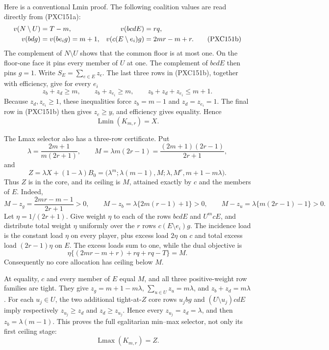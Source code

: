 \documentclass[11pt]{article}
\newcommand{\Lmin}{\operatorname{Lmin}}
\newcommand{\Lmax}{\operatorname{Lmax}}
\begin{document}
Here is a conventional Lmin proof.  The following coalition values are
read directly from (PXC151a):
\begin{align}
 v(N\setminus U)&=T-m,&
 v(bcdE)&=rq,\notag\\
 v(bdg)&=v(be_i g)=m+1,&
 v(c(E\setminus e_i)g)&=2mr-m+r.                  \tag{PXC151b}
\end{align}
The complement of \(N\setminus U\) shows that the common floor is at most
one.  On the floor-one face it pins every member of \(U\) at one.  The
complement of \(bcdE\) then pins \(g=1\).  Write
\(S_E=\sum_{e\in E}z_e\).  The last three rows in (PXC151b), together with
efficiency, give for every \(e_i\)
\[
 z_b+z_d\ge m,\qquad z_b+z_{e_i}\ge m,\qquad
 z_b+z_d+z_{e_i}\le m+1.                           \tag{PXC151c}
\]
Because \(z_d,z_{e_i}\ge1\), these inequalities force
\(z_b=m-1\) and \(z_d=z_{e_i}=1\).  The final row in (PXC151b) then gives
\(z_c\ge y\), and efficiency gives equality.  Hence
\[
 \Lmin(K_{m,r})=X.                                  \tag{PXC151d}
\]

The Lmax selector also has a three-row certificate.  Put
\[
 \lambda=\frac{2m+1}{m(2r+1)},\qquad
 M=\lambda m(2r-1)=\frac{(2m+1)(2r-1)}{2r+1},
\]
and
\begin{equation}
 Z=\lambda X+(1-\lambda)B_0
  =\bigl(\lambda^m;\lambda(m-1),M;\lambda,M^r,
          m+1-m\lambda\bigr).                       \tag{PXC151e}
\end{equation}
Thus \(Z\) is in the core, and its ceiling is \(M\), attained exactly by
\(c\) and the members of \(E\).  Indeed,
\[
 M-z_g=\frac{2mr-m-1}{2r+1}>0,\qquad
 M-z_b=\lambda\{2m(r-1)+1\}>0,\qquad
 M-z_u=\lambda\{m(2r-1)-1\}>0.
\]
Let \(\eta=1/(2r+1)\).  Give weight
\(\eta\) to each of the rows \(bcdE\) and \(U^m cE\), and distribute total
weight \(\eta\) uniformly over the \(r\) rows
\(c(E\setminus e_i)g\).  The incidence load is the constant load \(\eta\)
on every player, plus excess load \(2\eta\) on \(c\) and total excess load
\((2r-1)\eta\) on \(E\).  The excess loads sum to one, while the dual
objective is
\[
 \eta\{(2mr-m+r)+rq+rq-T\}=M.
\]
Consequently no core allocation has ceiling below \(M\).

At equality, \(c\) and every member of \(E\) equal \(M\), and all three
positive-weight row families are tight.  They give \(z_g=m+1-m\lambda\),
\(\sum_{u\in U}z_u=m\lambda\), and \(z_b+z_d=m\lambda\).  For each
\(u_j\in U\), the two additional tight-at-\(Z\) core rows \(u_jbg\) and
\((U\setminus u_j)cdE\) imply respectively \(z_{u_j}\ge z_d\) and
\(z_d\ge z_{u_j}\).  Hence every \(z_{u_j}=z_d=\lambda\), and then
\(z_b=\lambda(m-1)\).  This proves the full egalitarian min--max selector,
not only its first ceiling stage:
\[
 \Lmax(K_{m,r})=Z.                                  \tag{PXC151f}
\]
\end{document}
